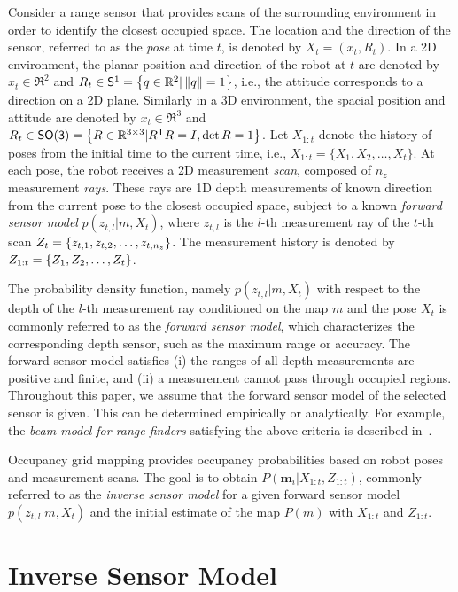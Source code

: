 Consider a range sensor that provides scans of the surrounding environment in order to identify the closest occupied space. The location and the direction of the sensor, referred to as the \emph{pose} at time $t$, is denoted by $X_t=(x_t,R_t)$. In a 2D environment, the planar position and direction of the robot at $t$ are denoted by $x_t\in\Re^2$ and $R_t\in\mathsf{S}^1=\left\{ q\in\mathbb{R}^2|\left\| q \right\|=1 \right\}$, i.e., the attitude corresponds to a direction on a 2D plane. Similarly in a 3D environment, the spacial position and attitude are denoted by $x_t\in\Re^3$ and $R_t\in\mathsf{SO(3)}=\left\{ R\in\mathbb{R}^{3\times3}|R^{\mathsf{T}} R=I,\det{R}=1 \right\}$. Let $X_{1:t}$ denote the history of poses from the initial time to the current time, i.e., $X_{1:t}=\{X_1,X_2,\ldots, X_t\}$. At each pose, the robot receives a 2D measurement \emph{scan}, composed of $n_z$ measurement \emph{rays}. These rays are 1D depth measurements of known direction from the current pose to the closest occupied space, subject to a known \emph{forward sensor model} $p(z_{t,l}|m,X_t)$, where $z_{t,l}$ is the $l$-th measurement ray of the $t$-th scan $Z_t=\left\{ z_{t,1},z_{t,2},\ldots,z_{t,n_z} \right\}$. The measurement history is denoted by $Z_{1:t}=\left\{ Z_1,Z_2,\ldots,Z_t \right\}$. 

The probability density function, namely $p(z_{t,l}|m,X_t)$ with respect to the depth of the $l$-th measurement ray conditioned on the map $m$ and the pose $X_t$ is commonly referred to as the \emph{forward sensor model}, which characterizes the corresponding depth sensor, such as the maximum range or accuracy. The forward sensor model satisfies (i) the ranges of all depth measurements are positive and finite, and (ii) a measurement cannot pass through occupied regions. Throughout this paper, we assume that the forward sensor model of the selected sensor is given. This can be determined empirically or analytically. For example, the \emph{beam model for range finders} satisfying  the above criteria is described in~\cite{ThrBurFox05}.

Occupancy grid mapping provides occupancy probabilities based on robot poses and measurement scans. The goal is to obtain $P(\mathbf{m}_i|X_{1:t},Z_{1:t})$, commonly referred to as the \emph{inverse sensor model} for a given forward sensor model $p(z_{t,l}|m,X_t)$ and the initial estimate of the map $P(m)$ with $X_{1:t}$ and $Z_{1:t}$.


\section{Inverse Sensor Model}

